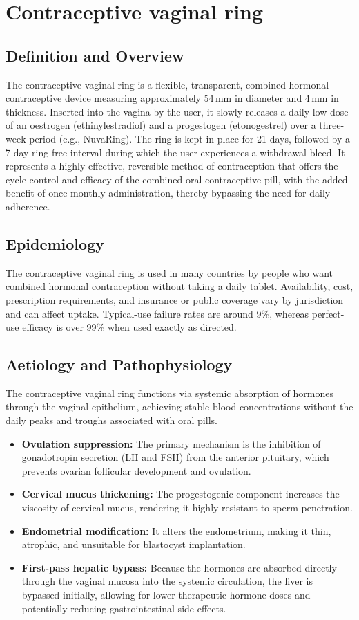 \chapter{Contraceptive vaginal ring}

\section*{Definition and Overview}
The contraceptive vaginal ring is a flexible, transparent, combined hormonal contraceptive device measuring approximately 54\,mm in diameter and 4\,mm in thickness. Inserted into the vagina by the user, it slowly releases a daily low dose of an oestrogen (ethinylestradiol) and a progestogen (etonogestrel) over a three-week period (e.g., NuvaRing). The ring is kept in place for 21 days, followed by a 7-day ring-free interval during which the user experiences a withdrawal bleed. It represents a highly effective, reversible method of contraception that offers the cycle control and efficacy of the combined oral contraceptive pill, with the added benefit of once-monthly administration, thereby bypassing the need for daily adherence.

\section*{Epidemiology}
The contraceptive vaginal ring is used in many countries by people who want combined hormonal contraception without taking a daily tablet. Availability, cost, prescription requirements, and insurance or public coverage vary by jurisdiction and can affect uptake. Typical-use failure rates are around 9\%, whereas perfect-use efficacy is over 99\% when used exactly as directed.

\section*{Aetiology and Pathophysiology}
The contraceptive vaginal ring functions via systemic absorption of hormones through the vaginal epithelium, achieving stable blood concentrations without the daily peaks and troughs associated with oral pills.
\begin{itemize}
    \item \textbf{Ovulation suppression:} The primary mechanism is the inhibition of gonadotropin secretion (LH and FSH) from the anterior pituitary, which prevents ovarian follicular development and ovulation.
    \item \textbf{Cervical mucus thickening:} The progestogenic component increases the viscosity of cervical mucus, rendering it highly resistant to sperm penetration.
    \item \textbf{Endometrial modification:} It alters the endometrium, making it thin, atrophic, and unsuitable for blastocyst implantation.
    \item \textbf{First-pass hepatic bypass:} Because the hormones are absorbed directly through the vaginal mucosa into the systemic circulation, the liver is bypassed initially, allowing for lower therapeutic hormone doses and potentially reducing gastrointestinal side effects.
\end{itemize}

